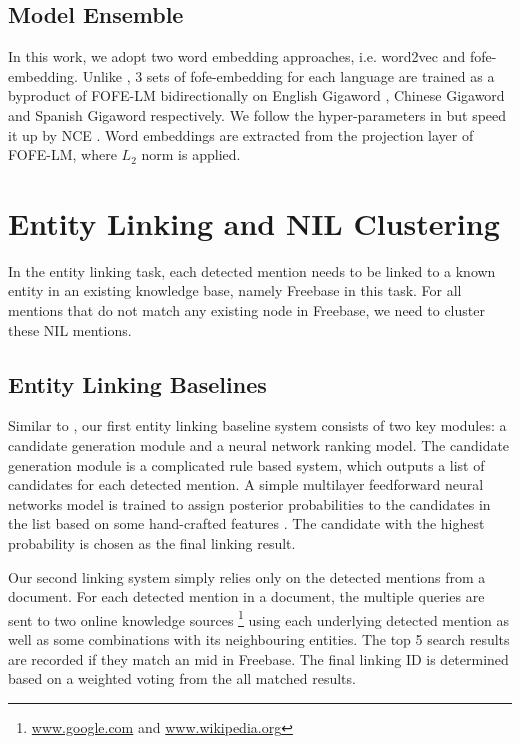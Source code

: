 \documentclass[11pt]{article}
\begin{document}
\subsection{Model Ensemble}

In this work, we adopt two word embedding approaches, i.e. word2vec \cite{mikolov2013distributed} and fofe-embedding. 
Unlike \cite{joseph2017embed}, 3 sets of fofe-embedding for each language are trained as a byproduct of FOFE-LM \cite{zhang2015fixed,zhang2015arxiv} bidirectionally on English Gigaword \cite{parker2011english}, Chinese Gigaword \cite{graff2005chinese} and Spanish Gigaword \cite{mendonca2009spanish} respectively. 
We follow the hyper-parameters in \cite{zhang2015fixed,zhang2015arxiv} but speed it up by NCE \cite{gutmann2010noise}. Word embeddings are extracted from the projection layer of FOFE-LM, where $L_2$ norm is applied. 

\section{Entity Linking and NIL Clustering}

In the entity linking task, each detected mention needs to be linked to a known entity in an existing
knowledge base, namely Freebase in this task. For all mentions that do not match any existing node in Freebase, we need to cluster these NIL mentions.

\subsection{Entity Linking Baselines}

Similar to \cite{kbp2016iflytek}, our first entity linking baseline system consists of two key modules: a candidate generation module and a neural network ranking model. The candidate generation module is a complicated rule based system, which outputs a list of candidates for each detected mention. A simple multilayer feedforward neural networks model is trained to assign posterior probabilities to the candidates in the list based on some hand-crafted features \cite{kbp2016iflytek}. The candidate with the highest probability is chosen as the final linking result. 

Our second linking system simply relies only on the detected mentions from a document. For each detected mention in a document, the multiple queries are sent to two online knowledge sources \footnote{\url{www.google.com} and \url{www.wikipedia.org}} using each underlying detected mention as well as some combinations with its neighbouring entities. The top 5 search results are recorded if they match an mid in Freebase. The final linking ID is determined based on a weighted voting from the all matched results.
\end{document}
